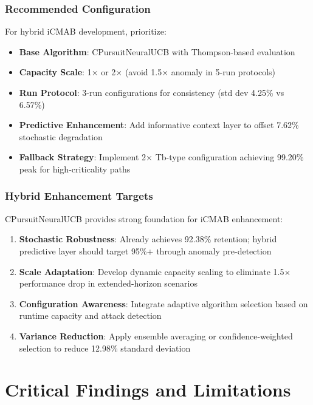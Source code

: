 \documentclass[12pt,a4paper]{article}
\newcommand{\primarytext}[1]{\textcolor{primaryblue}{\textbf{#1}}}
\newcommand{\secondarytext}[1]{\textcolor{secondaryblue}{\textbf{#1}}}
\newcommand{\success}[1]{\textcolor{accentgreen}{\textbf{#1}}}
\begin{document}
\subsubsection{Recommended Configuration}

For hybrid iCMAB development, prioritize:

\begin{itemize}
\item \primarytext{Base Algorithm}: CPursuitNeuralUCB with Thompson-based evaluation
\item \success{Capacity Scale}: 1× or 2× (avoid 1.5× anomaly in 5-run protocols)
\item \secondarytext{Run Protocol}: 3-run configurations for consistency (std dev 4.25\% vs 6.57\%)
\item \primarytext{Predictive Enhancement}: Add informative context layer to offset 7.62\% stochastic degradation
\item \success{Fallback Strategy}: Implement 2× Tb-type configuration achieving 99.20\% peak for high-criticality paths
\end{itemize}

\subsubsection{Hybrid Enhancement Targets}

CPursuitNeuralUCB provides strong foundation for iCMAB enhancement:

\begin{enumerate}
\item \primarytext{Stochastic Robustness}: Already achieves 92.38\% retention; hybrid predictive layer should target 95\%+ through anomaly pre-detection
\item \success{Scale Adaptation}: Develop dynamic capacity scaling to eliminate 1.5× performance drop in extended-horizon scenarios
\item \secondarytext{Configuration Awareness}: Integrate adaptive algorithm selection based on runtime capacity and attack detection
\item \primarytext{Variance Reduction}: Apply ensemble averaging or confidence-weighted selection to reduce 12.98\% standard deviation
\end{enumerate}

\section{Critical Findings and Limitations}
\end{document}
